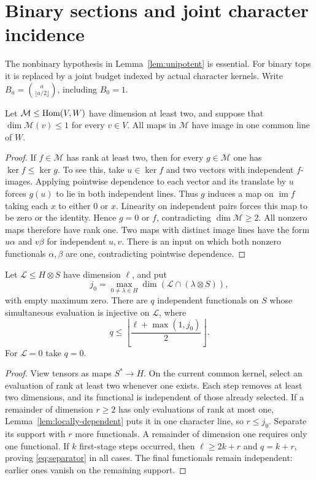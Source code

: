 \section{Binary sections and joint character incidence}
\label{sec:binary-capacity}
The nonbinary hypothesis in Lemma~\ref{lem:unipotent} is essential.
For binary tops it is replaced by a joint budget indexed by actual
character kernels. Write $B_a=\binom a{\lfloor a/2\rfloor}$, including
$B_0=1$.

\begin{lemma}\label{lem:locally-dependent}
Let $\mathcal M\leq\operatorname{Hom}(V,W)$ have dimension at least two, and suppose
that $\dim\mathcal M(v)\leq1$ for every $v\in V$. All maps in
$\mathcal M$ have image in one common line of $W$.
\end{lemma}
\begin{proof}
If $f\in\mathcal M$ has rank at least two, then for every
$g\in\mathcal M$ one has $\ker f\leq\ker g$. To see this, take
$u\in\ker f$ and two vectors with independent $f$-images. Applying
pointwise dependence to each vector and its translate by $u$ forces
$g(u)$ to lie in both independent lines. Thus $g$ induces a map on
$\operatorname{im}f$ taking each $x$ to either $0$ or $x$.
Linearity on independent pairs forces this map to be zero or the
identity. Hence $g=0$ or $f$, contradicting $\dim\mathcal M\geq2$.
All nonzero maps therefore have rank one. Two maps with distinct image
lines have the form $u\alpha$ and $v\beta$ for independent $u,v$.
There is an input on which both nonzero functionals $\alpha,\beta$
are one, contradicting pointwise dependence.
\end{proof}

\begin{lemma}\label{lem:separator}
Let $\mathcal L\leq H\otimes S$ have dimension $\ell$, and put
\[
 j_0=\max_{0\ne\lambda\in H}
       \dim(\mathcal L\cap(\lambda\otimes S)),
\]
with empty maximum zero. There are $q$ independent functionals on $S$
whose simultaneous evaluation is injective on $\mathcal L$, where
\begin{equation}\label{eq:separator}
 q\leq\left\lfloor\frac{\ell+\max(1,j_0)}2\right\rfloor.
\end{equation}
For $\mathcal L=0$ take $q=0$.
\end{lemma}
\begin{proof}
View tensors as maps $S^*\to H$. On the current common kernel,
select an evaluation of rank at least two whenever one exists. Each
step removes at least two dimensions, and its functional is independent
of those already selected. If a remainder of dimension $r\geq2$
has only evaluations of rank at most one, Lemma~\ref{lem:locally-dependent}
puts it in one character line, so $r\leq j_0$. Separate its support
with $r$ more functionals. A remainder of dimension one requires only
one functional. If $k$ first-stage steps occurred, then
$\ell\geq2k+r$ and $q=k+r$, proving \eqref{eq:separator} in all cases.
The final functionals remain independent: earlier ones vanish on the
remaining support.
\end{proof}

